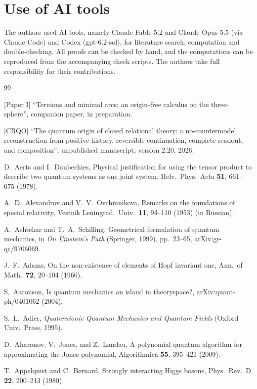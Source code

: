 \documentclass[aps,pra,onecolumn,superscriptaddress,nofootinbib,10pt]{revtex4-2}
\theoremstyle{definition}
\theoremstyle{remark}
\begin{document}
\section*{Use of AI tools}
The authors used AI tools, namely Claude Fable 5.2 and Claude Opus 5.5 (via Claude Code) and Codex (gpt-6.2-sol), for literature
search, computation and double-checking.  All proofs can be checked by hand, and the computations can be
reproduced from the accompanying check scripts.  The authors take full responsibility for their
contributions.

\begin{thebibliography}{99}\footnotesize

 [Paper I] ``Ternions and minimal arcs: an origin-free calculus on the three-sphere'', companion paper, in preparation.

 [CRQO] ``The quantum origin of closed relational theory: a no-countermodel reconstruction from positive history, reversible continuation, complete readout, and composition'', unpublished manuscript, version 2.20, 2026.

 D.~Aerts and I.~Daubechies, Physical justification for using the tensor product to describe two quantum systems as one joint system, Helv.\ Phys.\ Acta \textbf{51}, 661--675 (1978).

 A.~D.~Alexandrov and V.~V.~Ovchinnikova, Remarks on the foundations of special relativity, Vestnik Leningrad.\ Univ.\ \textbf{11}, 94--110 (1953) (in Russian). %

 A.~Ashtekar and T.~A.~Schilling, Geometrical formulation of quantum mechanics, in \emph{On Einstein's Path} (Springer, 1999), pp.~23--65, arXiv:gr-qc/9706069.

 J.~F.~Adams, On the non-existence of elements of Hopf invariant one, Ann.\ of Math.\ \textbf{72}, 20--104 (1960).

 S.~Aaronson, Is quantum mechanics an island in theoryspace?, arXiv:quant-ph/0401062 (2004).

 S.~L.~Adler, \emph{Quaternionic Quantum Mechanics and Quantum Fields} (Oxford Univ.\ Press, 1995).

 D.~Aharonov, V.~Jones, and Z.~Landau, A polynomial quantum algorithm for approximating the Jones polynomial, Algorithmica \textbf{55}, 395--421 (2009).

 T.~Appelquist and C.~Bernard, Strongly interacting Higgs bosons, Phys.\ Rev.\ D \textbf{22}, 200--213 (1980).


\end{thebibliography}
\end{document}
